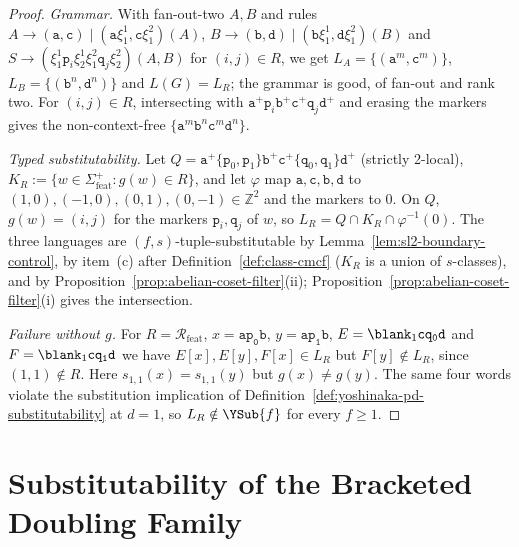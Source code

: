 \begin{proof}
\emph{Grammar.}  With fan-out-two $A,B$ and rules
$A\to(\mathtt a,\mathtt c)\mid(\mathtt a\xi_1^1,\mathtt c\xi_1^2)(A)$,
$B\to(\mathtt b,\mathtt d)\mid(\mathtt b\xi_1^1,\mathtt d\xi_1^2)(B)$ and
$S\to(\xi_1^1\mathtt p_i\xi_2^1\xi_1^2\mathtt q_j\xi_2^2)(A,B)$ for
$(i,j)\in R$, we get $L_A=\{(\mathtt a^m,\mathtt c^m)\}$,
$L_B=\{(\mathtt b^n,\mathtt d^n)\}$ and $L(G)=L_R$; the grammar is good,
of fan-out and rank two.  For $(i,j)\in R$, intersecting with
$\mathtt a^+\mathtt p_i\mathtt b^+\mathtt c^+\mathtt q_j\mathtt d^+$ and erasing the
markers gives the non-context-free $\{\mathtt a^m\mathtt b^n\mathtt c^m\mathtt d^n\}$.

\emph{Typed substitutability.}  Let
$Q=\mathtt a^+\{\mathtt p_0,\mathtt p_1\}\mathtt b^+\mathtt c^+\{\mathtt q_0,\mathtt q_1\}
\mathtt d^+$ (strictly 2-local), $K_R:=\{w\in\Sigma_{\mathrm{feat}}^+:g(w)\in R\}$, and let
$\varphi$ map $\mathtt a,\mathtt c,\mathtt b,\mathtt d$ to
$(1,0),(-1,0),(0,1),(0,-1)\in\mathbb Z^2$ and the markers to $0$.  On $Q$,
$g(w)=(i,j)$ for the markers $\mathtt p_i,\mathtt q_j$ of $w$, so
$L_R=Q\cap K_R\cap\varphi^{-1}(0)$.  The three languages are
$(f,s)$-tuple-substitutable by Lemma~\ref{lem:sl2-boundary-control}, by item~(c)
after Definition~\ref{def:class-cmcf} ($K_R$ is a union of $s$-classes), and by
Proposition~\ref{prop:abelian-coset-filter}(ii);
Proposition~\ref{prop:abelian-coset-filter}(i) gives the intersection.

\emph{Failure without $g$.}  For $R=\mathcal R_{\mathrm{feat}}$, $x=\mathtt{ap_0b}$,
$y=\mathtt{ap_1b}$, $E=\blank_1\mathtt{cq_0d}$ and $F=\blank_1\mathtt{cq_1d}$ we have
$E[x],E[y],F[x]\in L_R$ but $F[y]\notin L_R$, since $(1,1)\notin R$.  Here
$s_{1,1}(x)=s_{1,1}(y)$ but $g(x)\ne g(y)$.  The same four words violate the
substitution implication of Definition~\ref{def:yoshinaka-pd-substitutability} at
$d=1$, so $L_R\notin\YSub{f}$ for every $f\ge1$.
\end{proof}

\section{Substitutability of the Bracketed Doubling Family}
\label{app:bracketed-family}

